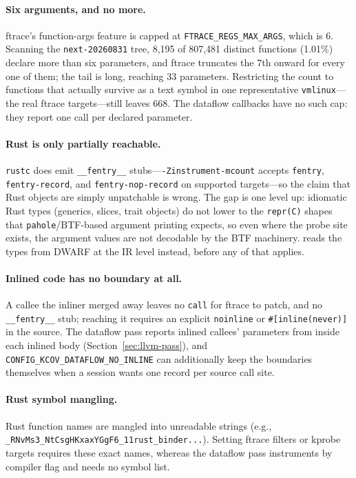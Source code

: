 \documentclass{article}
\begin{document}
\paragraph{Six arguments, and no more.} ftrace's function-args feature is
capped at \texttt{FTRACE\_REGS\_MAX\_ARGS}, which is 6. Scanning the
\texttt{next-20260831} tree, 8{,}195 of 807{,}481 distinct functions (1.01\%)
declare more than six parameters, and ftrace truncates the 7th onward for every
one of them; the tail is long, reaching 33 parameters. Restricting the count to
functions that actually survive as a text symbol in one representative
\texttt{vmlinux}---the real ftrace targets---still leaves 668. The dataflow
callbacks have no such cap: they report one call per declared parameter.

\paragraph{Rust is only partially reachable.} \texttt{rustc} does emit
\texttt{\_\_fentry\_\_} stubs---\texttt{-Zinstrument-mcount} accepts
\texttt{fentry}, \texttt{fentry-record}, and \texttt{fentry-nop-record} on
supported targets---so the claim that Rust objects are simply unpatchable is
wrong. The gap is one level up: idiomatic Rust types (generics, slices, trait
objects) do not lower to the \texttt{repr(C)} shapes that
\texttt{pahole}/BTF-based argument printing expects, so even where the probe
site exists, the argument values are not decodable by the BTF machinery.
\toolname{} reads the types from DWARF at the IR level instead, before any of
that applies.

\paragraph{Inlined code has no boundary at all.} A callee the inliner merged
away leaves no \texttt{call} for ftrace to patch, and no
\texttt{\_\_fentry\_\_} stub; reaching it requires an explicit
\texttt{noinline} or \texttt{\#[inline(never)]} in the source. The dataflow
pass reports inlined callees' parameters from inside each inlined body
(Section~\ref{sec:llvm-pass}), and
\texttt{CONFIG\_KCOV\_DATAFLOW\_NO\_INLINE} can additionally keep the
boundaries themselves when a session wants one record per source call site.

\paragraph{Rust symbol mangling.} Rust function names are mangled into
unreadable strings (e.g., \texttt{\_RNvMs3\_NtCsgHKxaxYGgF6\_11rust\_binder...}).
Setting ftrace filters or kprobe targets requires these exact names, whereas
the dataflow pass instruments by compiler flag and needs no symbol list.
\end{document}
